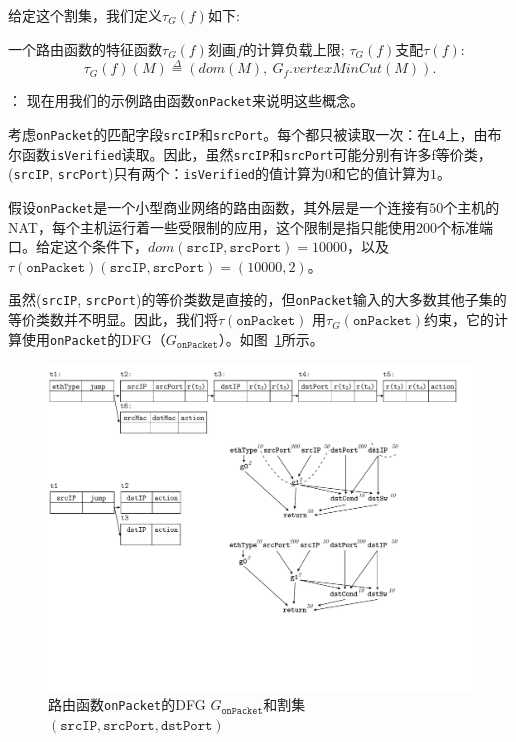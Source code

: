 给定这个割集，我们定义$\tau_G(f)$如下:



\begin{definition} 一个路由函数的特征函数$\tau_G(f)$刻画$f$的计算负载上限; $\tau_G(f)$支配$\tau(f)$:
\begin{equation*}
\tau_G(f)(M) \overset{\Delta}{=} (dom(M),\ G_f.vertexMinCut(M)).
\end{equation*}
\end{definition}

： 现在用我们的示例路由函数\texttt{onPacket}来说明这些概念。

考虑\texttt{onPacket}的匹配字段\texttt{srcIP}和\texttt{srcPort}。每个都只被读取一次：在\texttt{L4}上，由布尔函数\texttt{isVerified}读取。因此，虽然\texttt{srcIP}和\texttt{srcPort}可能分别有许多f等价类，(\texttt{srcIP}, \texttt{srcPort})只有两个：\texttt{isVerified}的值计算为$0$和它的值计算为$1$。

假设\texttt{onPacket}是一个小型商业网络的路由函数，其外层是一个连接有$50$个主机的NAT，每个主机运行着一些受限制的应用，这个限制是指只能使用$200$个标准端口。给定这个条件下，$dom(\texttt{srcIP}, \texttt{srcPort}) = 10000$，以及$\tau(\texttt{onPacket})(\texttt{srcIP}, \texttt{srcPort}) = (10000, 2)$。

虽然(\texttt{srcIP}, \texttt{srcPort})的等价类数是直接的，但\texttt{onPacket}输入的大多数其他子集的等价类数并不明显。因此，我们将$\tau(\texttt{onPacket})$ 用$\tau_G(\texttt{onPacket})$约束，它的计算使用\texttt{onPacket}的DFG（$G_{\texttt{onPacket}}$）。如图~\ref{cap:fig:onpkt-dfg}所示。



\begin{figure}[tbh]
    \centering
    \includegraphics[scale = 0.8]{figures/figure5.pdf}
    \caption{路由函数\texttt{onPacket}的DFG $G_{\texttt{onPacket}}$和割集$(\texttt{srcIP}, \texttt{srcPort}, \texttt{dstPort})$}
    \label{cap:fig:onpkt-dfg}
\end{figure}


